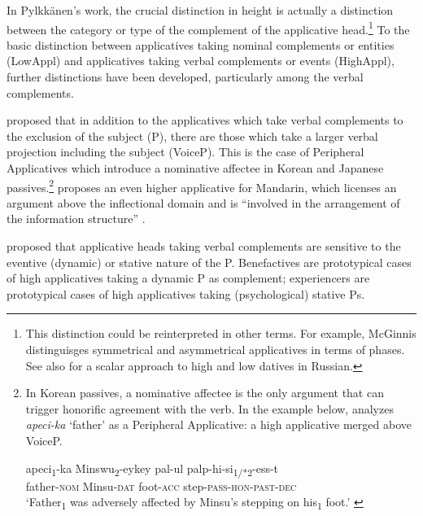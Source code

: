 \documentclass[output=paper,colorlinks,citecolor=brown,nonflat]{./langscibook}
\begin{document}
In Pylkkänen’s work, the crucial distinction in height is actually a distinction between the category or type of the complement of the applicative head.\footnote{This distinction could be reinterpreted in other terms. For example, McGinnis distinguisges symmetrical and asymmetrical applicatives in terms of phases. See also \citet{BonehNash2017} for a scalar approach to high and low datives in Russian.} To the basic distinction between applicatives taking nominal complements or entities (LowAppl) and applicatives taking verbal complements or events (HighAppl), further distinctions have been developed, particularly among the verbal complements.

\citet{Kim2011high} proposed that in addition to the applicatives which take verbal complements to the exclusion of the subject (\liv P), there are those which take a larger verbal projection including the subject (VoiceP). This is the case of Peripheral Applicatives which introduce a nominative affectee in Korean and Japanese passives.\footnote{In Korean passives, a nominative affectee is the only argument that can trigger honorific agreement with the verb. In the example below, \citet{Kim2012affectees} analyzes \textit{apeci-ka} ‘father’ as a Peripheral Applicative: a high applicative merged above VoiceP.

\ea%
    \gll apeci\textsubscript{1}-ka Minswu\textsubscript{2}-eykey pal-ul palp-hi-si\textsubscript{1/*2}-ess-t\\
    father\textsc{-nom}  Minsu\textsc{-dat} foot\textsc{-acc}   step\textsc{-pass-hon-past-dec}\\
    \glt ‘Father\textsubscript{1} was adversely affected by Minsu’s stepping on his\textsubscript{1} foot.’  \citep{Kim2012affectees}
    \z
} \citet{Tsai2018} proposes an even higher applicative for Mandarin, which licenses an argument above the inflectional domain and is “involved in the arrangement of the information structure” \citep[18]{Tsai2018}.


\citet{Cuervo2003, Cuervo2011, Cuervo2015Chapter} proposed that applicative heads taking verbal complements are sensitive to the eventive (dynamic) or stative nature of the \liv P. Benefactives are prototypical cases of high applicatives taking a dynamic \liv P as complement; experiencers are prototypical cases of high applicatives taking (psychological) stative \liv Ps.
\end{document}

